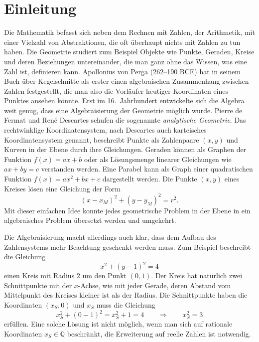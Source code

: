 %
%
%
\chapter*{Einleitung\label{chapter:einleitung}}
\rhead{}
Die Mathematik befasst sich neben dem Rechnen mit Zahlen, der Arithmetik,
mit einer Vielzahl von Abstraktionen, die oft überhaupt nichts mit 
Zahlen zu tun haben.
Die Geometrie studiert zum Beispiel Objekte wie Punkte, Geraden, Kreise
und deren Beziehungen untereinander, die man
ganz ohne das Wissen, was eine Zahl ist,
definieren kann.
Apollonius von Perga (262--190 BCE) hat in seinem Buch über Kegelschnitte
%
%
als erster einen algebraischen Zusammenhang zwischen Zahlen festgestellt,
die man also die Vorläufer heutiger Koordinaten eines Punktes ansehen könnte.
Erst im 16.~Jahrhundert entwickelte sich die Algebra weit genug,
dass eine Algebraisierung der Geometrie möglich wurde.
Pierre de Fermat
%
und René Descartes
%
schufen die sogenannte {\em analytische Geometrie}. 
%
%
Das rechtwinklige Koordinatensystem, nach Descartes auch karteisches
Koordinatensystem genannt, beschreibt Punkte als Zahlenpaare $(x,y)$
%
%
und Kurven in der Ebene durch ihre Gleichungen.
Geraden können als Graphen der Funktion $f(x) = ax+b$ oder als Lösungsmenge
linearer Gleichungen wie $ax+by=c$ verstanden werden.
Eine Parabel kann als Graph einer quadratischen Funktion $f(x)=ax^2+bx+c$
dargestellt werden.
Die Punkte $(x,y)$ eines Kreises lösen eine Gleichung der Form
\[
(x-x_M)^2 + (y-y_M)^2 = r^2.
\]
Mit dieser einfachen Idee konnte jedes geometrische Problem in der Ebene
in ein algebraisches Problem übersetzt werden und umgekehrt.

Die Algebraisierung macht allerdings auch klar, dass dem Aufbau des
Zahlensystems mehr Beachtung geschenkt werden muss.
Zum Beispiel beschreibt die Gleichung
\[
x^2+(y-1)^2=4
\]
einen Kreis mit Radius $2$ um den Punkt $(0,1)$.
Der Kreis hat natürlich zwei Schnittpunkte mit der $x$-Achse, wie mit jeder
Gerade, deren Abstand vom Mittelpunkt des Kreises kleiner ist als der Radius.
Die Schnittpunkte haben die Koordinaten $(x_S,0)$ und $x_S$ muss die
Gleichung
\[
x_S^2 + (0-1)^2 = x_S^2+1=4
\qquad\Rightarrow\qquad
x_S^2=3
\]
erfüllen.
%
Eine solche Lösung ist nicht möglich, wenn man sich auf rationale
Koordinaten $x_S\in\mathbb{Q}$ beschränkt, die Erweiterung auf
reelle Zahlen ist notwendig.
%

